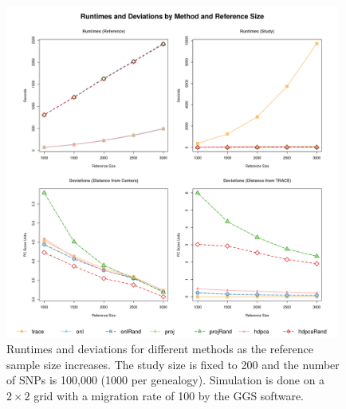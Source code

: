\documentclass{article}
\begin{document}
\begin{figure}[p]
  \label{fig:nChg}
  \centering
  \includegraphics[width=0.98\textwidth]{nChg}
  \caption{
    Runtimes and deviations for different methods as the reference sample size increases.
    The study size is fixed to 200 and the number of SNPs is 100,000 (1000 per genealogy). 
    Simulation is done on a $2 \times 2$ grid with a migration rate of 100 by the GGS software. 
  }
\end{figure}
\end{document}
